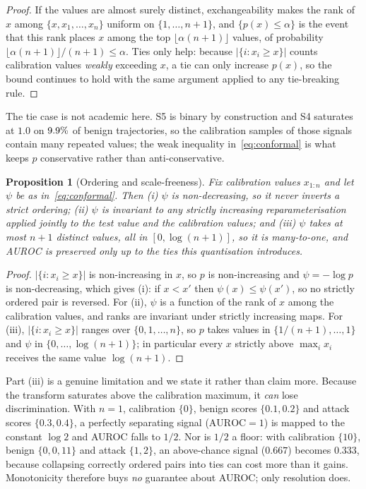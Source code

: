 \documentclass[preprint,12pt,number]{elsarticle}
\newtheorem{proposition}[theorem]{Proposition}
\theoremstyle{definition}
\begin{document}
\begin{proof}
If the values are almost surely distinct, exchangeability makes the rank of $x$
among $\{x, x_1, \dots, x_n\}$ uniform on $\{1,\dots,n+1\}$, and
$\{p(x) \le \alpha\}$ is the event that this rank places $x$ among the top
$\lfloor \alpha (n+1) \rfloor$ values, of probability
$\lfloor \alpha(n+1)\rfloor/(n+1) \le \alpha$. Ties only help: because
$|\{i : x_i \ge x\}|$ counts calibration values \emph{weakly} exceeding $x$, a tie
can only increase $p(x)$, so the bound continues to hold with the same argument
applied to any tie-breaking rule.
\end{proof}

The tie case is not academic here. S5 is binary by construction and S4 saturates
at $1.0$ on $9.9\%$ of benign trajectories, so the calibration samples of those
signals contain many repeated values; the weak inequality in~\eqref{eq:conformal}
is what keeps $p$ conservative rather than anti-conservative.

\begin{proposition}[Ordering and scale-freeness]\label{prop:mono}
Fix calibration values $x_{1:n}$ and let $\psi$ be as in~\eqref{eq:conformal}.
Then (i) $\psi$ is non-decreasing, so it never inverts a strict ordering;
(ii) $\psi$ is invariant to any strictly increasing reparameterisation applied
jointly to the test value and the calibration values; and (iii) $\psi$ takes at most $n+1$ distinct values, all in
$[0, \log(n+1)]$, so it is many-to-one, and AUROC is preserved only up to the
ties this quantisation introduces.
\end{proposition}

\begin{proof}
$|\{i : x_i \ge x\}|$ is non-increasing in $x$, so $p$ is non-increasing and
$\psi = -\log p$ is non-decreasing, which gives (i): if $x < x'$ then
$\psi(x) \le \psi(x')$, so no strictly ordered pair is reversed.
For (ii), $\psi$ is a function of the rank of $x$ among the calibration values,
and ranks are invariant under strictly increasing maps. For (iii),
$|\{i : x_i \ge x\}|$ ranges over $\{0,1,\dots,n\}$, so $p$ takes values in
$\{1/(n{+}1), \dots, 1\}$ and $\psi$ in $\{0, \dots, \log(n{+}1)\}$; in
particular every $x$ strictly above $\max_i x_i$ receives the same value
$\log(n{+}1)$.
\end{proof}

Part (iii) is a genuine limitation and we state it rather than claim more.
Because the transform saturates above the calibration maximum, it \emph{can} lose
discrimination. With $n=1$, calibration $\{0\}$, benign scores $\{0.1, 0.2\}$ and
attack scores $\{0.3, 0.4\}$, a perfectly separating signal ($\mathrm{AUROC}=1$) is
mapped to the constant $\log 2$ and AUROC falls to $1/2$. Nor is $1/2$ a floor:
with calibration $\{10\}$, benign $\{0,0,11\}$ and attack $\{1,2\}$, an
above-chance signal ($0.667$) becomes $0.333$, because collapsing correctly
ordered pairs into ties can cost more than it gains. Monotonicity therefore buys
\emph{no} guarantee about AUROC; only resolution does.
\end{document}
